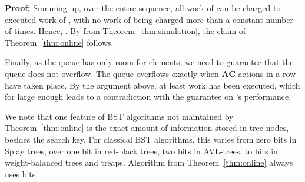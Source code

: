 \documentclass[11pt]{article}
\newenvironment{proof}{\noindent\textbf{Proof: }\ignorespaces}
  {\hspace*{\fill}\medskip}
\begin{document}
\begin{proof}
Summing up, over the entire sequence, all work of  can be charged
to executed work of , with no work of  being charged more than a
constant number of times.  Hence, . By
 from Theorem~\ref{thm:simulation}, the claim
 of Theorem~\ref{thm:online} follows.

Finally, as the queue has only room for  elements, we need to
guarantee that the queue does not overflow. The queue overflows exactly
when  \textbf{AC} actions in a row have taken place. By the argument
above, at least   work has been
executed, which for  large enough leads to a contradiction with the
guarantee on 's performance.

\end{proof}

We note that one feature of BST algorithms not maintained by
Theorem~\ref{thm:online} is the exact amount of information stored in tree
nodes, besides the search key. For classical BST algorithms, this varies
from zero bits in Splay trees, over one bit in red-black trees, two bits in
AVL-trees, to  bits in weight-balanced trees and treaps. Algorithm
 from Theorem~\ref{thm:online} always uses  bits.





\end{document}
